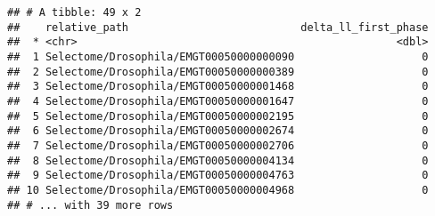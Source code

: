 \documentclass[
]{article}
\newenvironment{Shaded}{\begin{snugshade}}{\end{snugshade}}
\newcommand{\KeywordTok}[1]{\textcolor[rgb]{0.13,0.29,0.53}{\textbf{#1}}}
\newcommand{\NormalTok}[1]{#1}
\newcommand{\OperatorTok}[1]{\textcolor[rgb]{0.81,0.36,0.00}{\textbf{#1}}}
\newcommand{\StringTok}[1]{\textcolor[rgb]{0.31,0.60,0.02}{#1}}
\begin{document}
\begin{verbatim}
## # A tibble: 49 x 2
##    relative_path                           delta_ll_first_phase
##  * <chr>                                                  <dbl>
##  1 Selectome/Drosophila/EMGT00050000000090                    0
##  2 Selectome/Drosophila/EMGT00050000000389                    0
##  3 Selectome/Drosophila/EMGT00050000001468                    0
##  4 Selectome/Drosophila/EMGT00050000001647                    0
##  5 Selectome/Drosophila/EMGT00050000002195                    0
##  6 Selectome/Drosophila/EMGT00050000002674                    0
##  7 Selectome/Drosophila/EMGT00050000002706                    0
##  8 Selectome/Drosophila/EMGT00050000004134                    0
##  9 Selectome/Drosophila/EMGT00050000004763                    0
## 10 Selectome/Drosophila/EMGT00050000004968                    0
## # ... with 39 more rows
\end{verbatim}

\begin{Shaded}
\end{Shaded}
\end{document}
